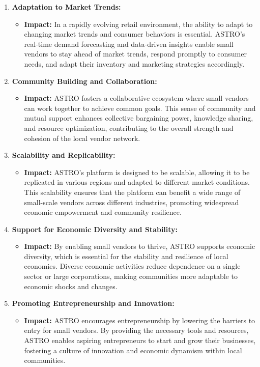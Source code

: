 \begin{enumerate}
	\item \textbf{Adaptation to Market Trends:}
	      \begin{itemize}
		      \item \textbf{Impact:} In a rapidly evolving retail environment, the ability to adapt to changing market trends and consumer behaviors is essential. ASTRO’s real-time demand forecasting and data-driven insights enable small vendors to stay ahead of market trends, respond promptly to consumer needs, and adapt their inventory and marketing strategies accordingly.
	      \end{itemize}

	\item \textbf{Community Building and Collaboration:}
	      \begin{itemize}
		      \item \textbf{Impact:} ASTRO fosters a collaborative ecosystem where small vendors can work together to achieve common goals. This sense of community and mutual support enhances collective bargaining power, knowledge sharing, and resource optimization, contributing to the overall strength and cohesion of the local vendor network.
	      \end{itemize}

	\item \textbf{Scalability and Replicability:}
	      \begin{itemize}
		      \item \textbf{Impact:} ASTRO’s platform is designed to be scalable, allowing it to be replicated in various regions and adapted to different market conditions. This scalability ensures that the platform can benefit a wide range of small-scale vendors across different industries, promoting widespread economic empowerment and community resilience.
	      \end{itemize}

	\item \textbf{Support for Economic Diversity and Stability:}
	      \begin{itemize}
		      \item \textbf{Impact:} By enabling small vendors to thrive, ASTRO supports economic diversity, which is essential for the stability and resilience of local economies. Diverse economic activities reduce dependence on a single sector or large corporations, making communities more adaptable to economic shocks and changes.
	      \end{itemize}

	\item \textbf{Promoting Entrepreneurship and Innovation:}
	      \begin{itemize}
		      \item \textbf{Impact:} ASTRO encourages entrepreneurship by lowering the barriers to entry for small vendors. By providing the necessary tools and resources, ASTRO enables aspiring entrepreneurs to start and grow their businesses, fostering a culture of innovation and economic dynamism within local communities.
	      \end{itemize}


\end{enumerate}
